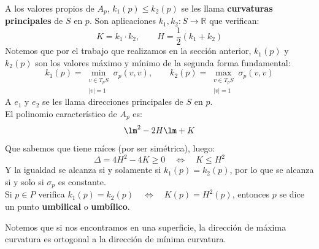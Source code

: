 \begin{notacion}
    A los valores propios de $A_p$, $k_1(p)\leq k_2(p)$ se les llama \textbf{curvaturas principales} de $S$ en $p$. Son aplicaciones $k_1,k_2:S\to\mathbb{R}$ que verifican:
    \begin{equation*}
        K = k_1\cdot k_2, \qquad H = \frac{1}{2}(k_1+k_2)
    \end{equation*}
    Notemos que por el trabajo que realizamos en la sección anterior, $k_1(p)$ y $k_2(p)$ son los valores máximo y mínimo de la segunda forma fundamental:
    \begin{equation*}
        k_1(p) = \min_{\substack{v\in T_pS\\|v| =1}} \sigma_p(v,v), \qquad k_2(p) = \max_{\substack{v\in T_pS\\|v| =1}}\sigma_p(v,v)
    \end{equation*}
    A $e_1$ y $e_2$ se les llama direcciones principales de $S$ en $p$.\\

    \noindent
    El polinomio característico de $A_p$ es:
    \begin{equation*}
        \lm^2 - 2H\lm + K 
    \end{equation*}
    Que sabemos que tiene raíces (por ser simétrica), luego:
    \begin{equation*}
        \Delta = 4H^2 - 4K \geq 0 \quad\Longleftrightarrow\quad K\leq H^2
    \end{equation*}
    Y la igualdad se alcanza si y solamente si $k_1(p) = k_2(p)$, por lo que se alcanza si y solo si $\sigma_p$ es constante.\\

    \noindent
    Si $p\in P$ verifica $k_1(p) = k_2(p) \quad\Longleftrightarrow\quad K(p) = H^2(p)$, entonces $p$ se dice un punto \textbf{umbilical} o \textbf{umbílico}.
\end{notacion}

\begin{observacion}
    Notemos que si nos encontramos en una superficie, la dirección de máxima curvatura es ortogonal a la dirección de mínima curvatura.
\end{observacion}

